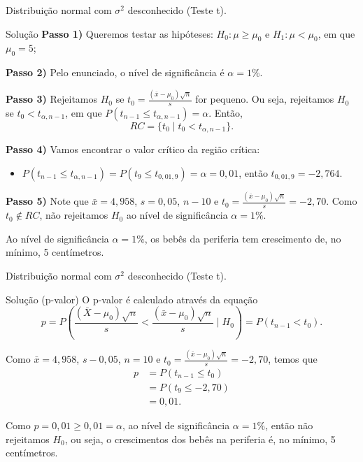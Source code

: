 \documentclass[8pt]{beamer}
\begin{document}
\begin{frame}{Distribuição normal com $\sigma^2$ desconhecido (Teste t).}

\large

\begin{block}{Solução}
	\textbf{Passo 1)} Queremos testar as hipóteses: $H_0: \mu \geq \mu_0$ e $H_1: \mu < \mu_0$, em que $\mu_0=5$;
	
	\textbf{Passo 2)} Pelo enunciado, o nível de significância é $\alpha=1\%$.
	
	\textbf{Passo 3)} Rejeitamos $H_0$ se $t_0= \frac{(\bar{x} - \mu_0)\sqrt{n}}{s}$ for pequeno. Ou seja, rejeitamos $H_0$ se $t_0 < t_{\alpha, n-1}$, em que $P\left( t_{n-1} \leq t_{\alpha, n-1} \right)=\alpha$. Então,
	$$RC = \{ t_0 \mid t_0 < t_{\alpha, n-1} \}.$$
	
	\textbf{Passo 4)} Vamos encontrar o valor crítico da região crítica:
	\begin{itemize}
		\item $P\left(t_{n-1} \leq t_{\alpha, n-1}\right) = P\left(t_{9} \leq t_{0,01, 9}\right)= \alpha = 0,01$, então $t_{0,01, 9} = -2,764$.
	\end{itemize}

	\textbf{Passo 5)} Note que $\bar{x}= 4,958$, $s=0,05$, $n-10$ e $t_0 = \frac{(\bar{x}- \mu_0)\sqrt{n}}{s} = -2,70$. Como $t_0 \not\in RC$, não rejeitamos $H_0$ ao nível de significância $\alpha=1\%$.
	
	Ao nível de significância $\alpha=1\%$, os bebês da periferia tem crescimento de, no mínimo, 5 centímetros.
\end{block}

\normalsize

\end{frame}

\begin{frame}{Distribuição normal com $\sigma^2$ desconhecido (Teste t).}

\large

\begin{block}{Solução (p-valor)}
	O p-valor é calculado através da equação
	$$p = P\left( \frac{(\bar{X} - \mu_0)\sqrt{n}}{s} < \frac{(\bar{x} - \mu_0)\sqrt{n}}{s} \mid H_0 \right) = P\left( t_{n-1} < t_0 \right).$$
	
	Como $\bar{x} = 4,958$, $s-0,05$, $n=10$ e $t_0 = \frac{(\bar{x} - \mu_0)\sqrt{n}}{s} = -2,70$, temos que
	\begin{align*}
		p &= P \left( t_{n-1} \leq t_0\right)\\
		&= P \left( t_9 \leq -2,70\right)\\
		&= 0,01.
	\end{align*}
	
	Como $p=0,01 \geq 0,01 = \alpha$, ao nível de significância $\alpha=1\%$, então não rejeitamos $H_0$, ou seja, o crescimentos dos bebês na periferia é, no mínimo, 5 centímetros.		
\end{block}

\normalsize

\end{frame}
\end{document}
